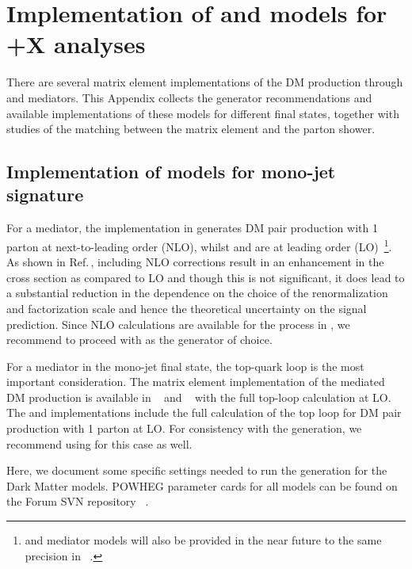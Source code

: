 \section{\texorpdfstring{Implementation of \schannel and \tchannel models for \MET+X analyses}{Implementation of \schannel and \tchannel models for \MET+X analyses}}

There are several matrix element implementations of the
DM production through \spinzero and \spinone mediators. This Appendix collects the 
generator recommendations and available implementations
of these models for different final states, together with studies 
of the matching between the matrix element and the parton shower. 

\subsection{Implementation of models for mono-jet signature}
\label{sec:monojet_implementation}

For a \spinone mediator, the implementation in \powheg generates
DM pair production with 1 parton at next-to-leading order (NLO), 
whilst \madgraph and \mcfm are at leading order (LO)~\footnote{\spinzero and \spinone 
mediator models will also be provided 
in the near future to the same precision in \madgraph~\cite{Alwall:1405.0301}.}. As shown in \powheg Ref.\,\cite{Haisch:2013ata}, including NLO corrections result in an enhancement in the cross section as compared to LO and though this is not significant, it does lead to a substantial reduction in the dependence on the choice of the renormalization and factorization scale and hence the theoretical uncertainty on the signal prediction. 
Since NLO calculations are available for the process in \powheg, we recommend to proceed with \powheg as the generator of choice. 

For a \spinzero mediator in the mono-jet final state, the top-quark loop is the most important consideration.
The matrix element implementation of the \schannel \spinzero mediated DM production is available in \mcfm~\cite{Fox:2012ru,Harris:2014hga} and \powheg~\cite{Haisch:2015ioa} with the full top-loop calculation at LO.
The \powheg and \mcfm implementations include 
the full calculation of the top loop 
for DM pair production with 1 parton at LO.
For consistency with the \spinone generation, we recommend using \powheg
for this case as well.

Here, we document some specific settings needed to run the \powheg 
generation for the Dark Matter models. POWHEG parameter cards for all models
can be found on the Forum SVN repository
~\cite{ForumSVN_DMA, ForumSVN_DMV, ForumSVN_DMS, ForumSVN_DMGG}.



